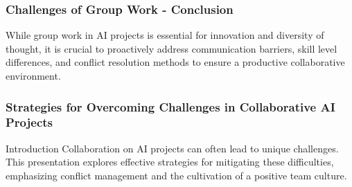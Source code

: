 \documentclass[aspectratio=169]{beamer}
\begin{document}
\begin{frame}[fragile]
    \frametitle{Challenges of Group Work - Conclusion}
    While group work in AI projects is essential for innovation and diversity of thought, it is crucial to proactively address communication barriers, skill level differences, and conflict resolution methods to ensure a productive collaborative environment.
\end{frame}

\begin{frame}[fragile]
    \frametitle{Strategies for Overcoming Challenges in Collaborative AI Projects}
    \begin{block}{Introduction}
        Collaboration on AI projects can often lead to unique challenges. This presentation explores effective strategies for mitigating these difficulties, emphasizing conflict management and the cultivation of a positive team culture.
    \end{block}
\end{frame}
\end{document}
